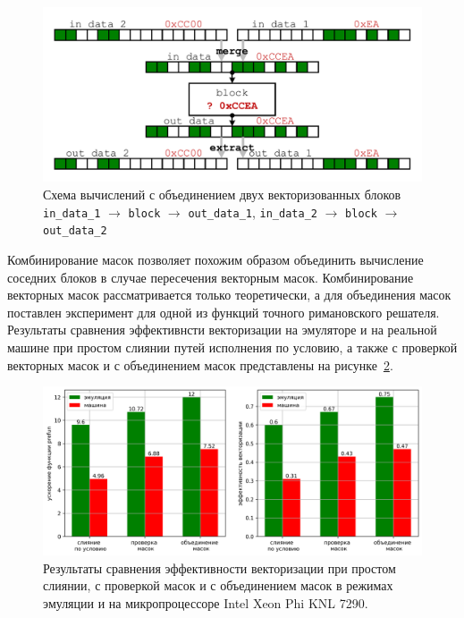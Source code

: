 \documentclass[a4paper,14pt]{extarticle}                     %
\theoremstyle{plain}                                         %
\begin{document}
\begin{figure}[ht]
\centering
\includegraphics[width=1.0\textwidth]{./pics/text_4_vec_comb_mask/comb_masks.pdf}
\singlespacing
{}\caption{Схема вычислений с объединением двух векторизованных блоков \texttt{in\_data\_1} $\rightarrow$ \texttt{block} $\rightarrow$ \texttt{out\_data\_1}, \texttt{in\_data\_2} $\rightarrow$ \texttt{block} $\rightarrow$ \texttt{out\_data\_2}}
\label{fig:text_4_vec_comb_mask_comb_masks}
\end{figure}

Комбинирование масок позволяет похожим образом объединить вычисление соседних блоков в случае пересечения векторным масок.
Комбинирование векторных масок рассматривается только теоретически, а для объединения масок поставлен эксперимент для одной из функций точного римановского решателя.
Результаты сравнения эффективнсти векторизации на эмуляторе и на реальной машине при простом слиянии путей исполнения по условию, а также с проверкой векторных масок и с объединением масок представлены на рисунке~\ref{fig:text_4_vec_comb_mask_res}.

\begin{figure}[ht]
\centering
\includegraphics[width=1.0\textwidth]{./pics/text_4_vec_comb_mask/res.png}
\singlespacing
{}\caption{Результаты сравнения эффективности векторизации при простом слиянии, с проверкой масок и с объединением масок в режимах эмуляции и на микропроцессоре Intel Xeon Phi KNL 7290.}
\label{fig:text_4_vec_comb_mask_res}
\end{figure}
\end{document}
